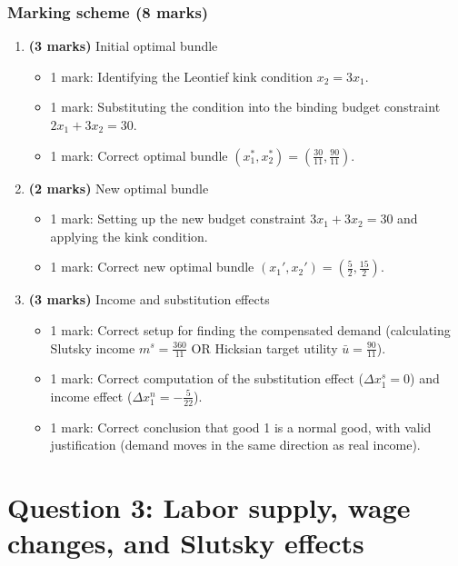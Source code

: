 \documentclass[12pt]{article}
\begin{document}
\newpage
\subsubsection*{Marking scheme (8 marks)}

\begin{enumerate}[label=(\alph*)]
\item \textbf{(3 marks)} Initial optimal bundle
\begin{itemize}
\item 1 mark: Identifying the Leontief kink condition $x_2 = 3x_1$.
\item 1 mark: Substituting the condition into the binding budget constraint $2x_1 + 3x_2 = 30$.
\item 1 mark: Correct optimal bundle $(x_1^*, x_2^*) = \left(\frac{30}{11}, \frac{90}{11}\right)$.
\end{itemize}

\item \textbf{(2 marks)} New optimal bundle
\begin{itemize}
\item 1 mark: Setting up the new budget constraint $3x_1 + 3x_2 = 30$ and applying the kink condition.
\item 1 mark: Correct new optimal bundle $(x_1', x_2') = \left(\frac{5}{2}, \frac{15}{2}\right)$.
\end{itemize}

\item \textbf{(3 marks)} Income and substitution effects
\begin{itemize}
\item 1 mark: Correct setup for finding the compensated demand (calculating Slutsky income $m^s = \frac{360}{11}$ OR Hicksian target utility $\bar{u} = \frac{90}{11}$).
\item 1 mark: Correct computation of the substitution effect ($\Delta x_1^s = 0$) and income effect ($\Delta x_1^n = -\frac{5}{22}$).
\item 1 mark: Correct conclusion that good 1 is a normal good, with valid justification (demand moves in the same direction as real income).
\end{itemize}
\end{enumerate}

\newpage
\section*{Question 3: Labor supply, wage changes, and Slutsky effects}
\end{document}
